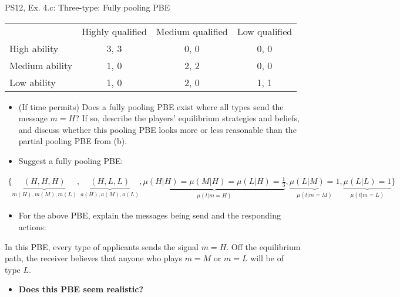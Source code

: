 \begin{frame}{PS12, Ex. 4.c: Three-type: Fully pooling PBE}
    \begin{table}
      \begin{tabular}{l|c|c|c|}
          \multicolumn{1}{c}{} & \multicolumn{1}{c}{Highly qualified} & \multicolumn{1}{c}{Medium qualified} & \multicolumn{1}{c}{Low qualified} \\\cline{2-4}
          High ability   & 3, 3 & 0, 0 & 0, 0 \\\cline{2-4}
          Medium ability & 1, 0 & 2, 2 & 0, 0 \\\cline{2-4}
          Low ability    & 1, 0 & 2, 0 & 1, 1 \\\cline{2-4}
      \end{tabular}
    \end{table}\vspace{-8pt}
    \begin{itemize}
      \item[(c)] (If time permits) Does a fully pooling PBE exist where all types send the message $m = H$? If so, describe the players’ equilibrium strategies and beliefs, and discuss whether this pooling PBE looks more or less reasonable than the partial pooling PBE from (b).
      \item[Step 1:] Suggest a fully pooling PBE:
    \end{itemize}\vspace{-12pt}
    \begin{align*}
      \{\underbrace{(H,H,H)}_{m(H),m(M),m(L)},\underbrace{(H,L,L)}_{a(H),a(M),a(L)},\underbrace{\mu(H|H)=\mu(M|H)=\mu(L|H)=\frac{1}{3}}_{\mu(t|m=H)},\underbrace{\mu(L|M)=1}_{\mu(t|m=M)},\underbrace{\mu(L|L)=1}_{\mu(t|m=L)}\}
    \end{align*}\vspace{-14pt}
    \begin{itemize}
        \item[Step 2:] For the above PBE, explain the messages being send and the responding actions:
    \end{itemize}\vspace{-2pt}
    In this PBE, every type of applicants sends the signal $m=H$. Off the equilibrium path, the receiver believes that anyone who plays $m=M$ or $m=L$ will be of type $L$.\vspace{-2pt}
    \begin{itemize}
        \item[Step 3:] \textbf{Does this PBE seem realistic?}
    \end{itemize}
    \vfill\null
\end{frame}

